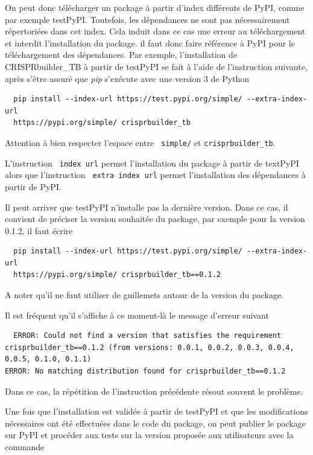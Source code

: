 \documentclass[twoside,a4paper,11pt,frenchb,openany]{report}
\begin{document}
On peut donc télécharger un package à partir d'index différents de PyPI, comme par exemple testPyPI. Toutefois, les dépendances ne sont pas nécessairement répertoriées dans cet index. Cela induit dans ce cas une erreur au téléchargement et interdit l'installation du package. il faut donc faire référence à PyPI pour le téléchargement des dépendances. Par exemple, l'installation de CRISPRbuilder\_TB à partir de testPyPI se fait à l'aide de l'instruction suivante, après s'être assuré que \textit{pip} s'exécute avec une version 3 de Python

\begin{verbatim}  pip install --index-url https://test.pypi.org/simple/ --extra-index-url 
  https://pypi.org/simple/ crisprbuilder_tb\end{verbatim} 

Attention à bien respecter l'espace entre \texttt{ simple/} et \texttt{crisprbuilder\_tb}.

L'instruction \texttt{ \textemdash \textemdash index \textemdash url} permet l'installation du package à partir de textPyPI alors que l'instruction \texttt{ \textemdash \textemdash extra \textemdash index \textemdash url} permet l'installation des dépendances à partir de PyPI.

Il peut arriver que testPyPI n'installe pas la dernière version. Dans ce cas, il convient de préciser la version souhaitée du package, par exemple pour la version 0.1.2, il faut écrire

\begin{verbatim}  pip install --index-url https://test.pypi.org/simple/ --extra-index-url 
  https://pypi.org/simple/ crisprbuilder_tb==0.1.2\end{verbatim} 

A noter qu'il ne faut utiliser de guillemets autour de la version du package.

Il est fréquent qu'il s'affiche à ce moment-là le message d'erreur suivant

\begin{verbatim}  ERROR: Could not find a version that satisfies the requirement crisprbuilder_tb==0.1.2 (from versions: 0.0.1, 0.0.2, 0.0.3, 0.0.4, 0.0.5, 0.1.0, 0.1.1)
ERROR: No matching distribution found for crisprbuilder_tb==0.1.2\end{verbatim}

Dans ce cas, la répétition de l'instruction précédente résout souvent le problème.

Une fois que l'installation est validée à partir de testPyPI et que les modifications nécessaires ont été effectuées dans le code du package, on peut publier le package sur PyPI et procéder aux tests sur la version proposée aux utilisateurs avec la commande
\end{document}
